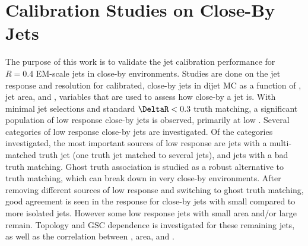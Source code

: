 \clearpage

\section{Calibration Studies on Close-By Jets}

The purpose of this work is to validate the jet calibration performance for $R = 0.4$ \akt EM-scale jets in close-by environments. Studies are done on the jet response and resolution for calibrated, close-by jets in  dijet MC as a function of \DeltaRmin, jet area, and \fCloseby, variables that are used to assess how close-by a jet is. With minimal jet selections and standard $\DeltaR < 0.3$ truth matching, a significant population of low response close-by jets is observed, primarily at low \pt. Several categories of low response close-by jets are investigated. Of the categories investigated, the most important sources of low response are jets with a multi-matched truth jet (one truth jet matched to several jets), and jets with a bad truth matching. Ghost truth association is studied as a robust alternative to \DeltaR truth matching, which can break down in very close-by environments. After removing different sources of low response and switching to ghost truth matching, good agreement is seen in the response for close-by jets with small \DeltaRmin compared to more isolated jets. However some low response jets with small area and/or large \fCloseby remain. Topology and GSC dependence is investigated for these remaining jets, as well as the correlation between \DeltaRmin, area, and \fCloseby.